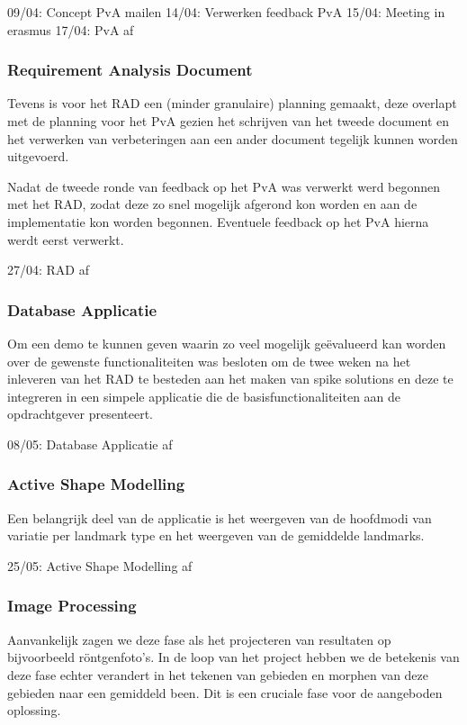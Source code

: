 09/04: Concept PvA mailen
14/04: Verwerken feedback PvA
15/04: Meeting in erasmus
17/04: PvA af

\subsubsection{Requirement Analysis Document}

Tevens is voor het RAD een (minder granulaire) planning gemaakt, deze overlapt
met de planning voor het PvA gezien het schrijven van het tweede document en
het verwerken van verbeteringen aan een ander document tegelijk kunnen worden
uitgevoerd.

Nadat de tweede ronde van feedback op het PvA was verwerkt werd begonnen met
het RAD, zodat deze zo snel mogelijk afgerond kon worden en aan de
implementatie kon worden begonnen. Eventuele feedback op het PvA hierna werdt
eerst verwerkt.

27/04: RAD af

\subsubsection{Database Applicatie}

Om een demo te kunnen geven waarin zo veel mogelijk ge\"{e}valueerd kan worden
over de gewenste functionaliteiten was besloten om de twee weken na het
inleveren van het RAD te besteden aan het maken van spike solutions en deze te
integreren in een simpele applicatie die de basisfunctionaliteiten aan de
opdrachtgever presenteert.

08/05: Database Applicatie af

\subsubsection{Active Shape Modelling}

Een belangrijk deel van de applicatie is het weergeven van de hoofdmodi van
variatie per landmark type en het weergeven van de gemiddelde landmarks.

25/05: Active Shape Modelling af

\subsubsection{Image Processing}

Aanvankelijk zagen we deze fase als het projecteren van resultaten op
bijvoorbeeld r\"{o}ntgenfoto's. In de loop van het project hebben we de
betekenis van deze fase echter verandert in het tekenen van gebieden en
morphen van deze gebieden naar een gemiddeld been. Dit is een cruciale fase
voor de aangeboden oplossing.

